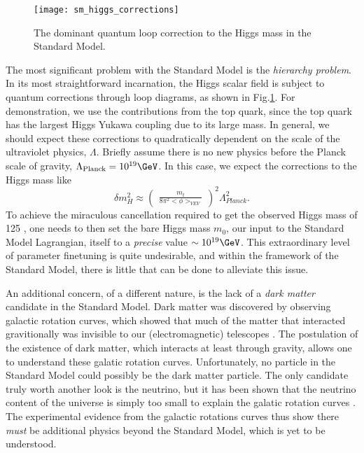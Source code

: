 \begin{figure}
\caption{The dominant quantum loop correction to the Higgs mass in the Standard Model.} \label{fig:sm_higgs_corrections}
\texttt{[image: sm\_higgs\_corrections]}
\end{figure}
The most significant problem with the Standard Model is the \textit{hierarchy problem}.
In its most straightforward incarnation, the Higgs scalar field is subject to quantum corrections through loop diagrams, as shown in Fig.\ref{fig:sm_higgs_corrections}.
For demonstration, we use the contributions from the top quark, since the top quark has the largest Higgs Yukawa coupling due to its large mass.
In general, we should expect these corrections to quadratically dependent on the scale of the ultraviolet physics, $\Lambda$.
Briefly assume there is no new physics before the Planck scale of gravity, $\Lambda_{\text{Planck}} = 10^{19} \GeV$.
In this case, we expect the corrections to the Higgs mass like
\begin{equation}
\delta m^2_H \approx \begin{pmatrix} \frac{m_t}{8\pi^2 <\phi>_{VEV}} \end{pmatrix}^2 \Lambda_{Planck}^2.
\end{equation}
To achieve the miraculous cancellation required to get the observed Higgs mass of 125 \GeV, one needs to then set the bare Higgs mass $m_0$, our input to the Standard Model Lagrangian, itself to a \textit{precise} value $\order 10^{19} \GeV$.
This extraordinary level of parameter finetuning is quite undesirable, and within the framework of the Standard Model, there is little that can be done to alleviate this issue.

An additional concern, of a different nature, is the lack of a \textit{dark matter} candidate in the Standard Model.
Dark matter was discovered by observing galactic rotation curves, which showed that much of the matter that interacted gravitionally was invisible to our (electromagnetic) telescopes \cite{Rubin:1970zza, Roberts:1970zza, Rubin:1980zd, Rubin:1985ze, Bosma:1981zz, Persic:1995ru, darkMatterPrimer}.
The postulation of the existence of dark matter, which interacts at least through gravity, allows one to understand these galatic rotation curves.
Unfortunately, no particle in the Standard Model could possibly be the dark matter particle.
The only candidate truly worth another look is the neutrino, but it has been shown that the neutrino content of the universe is simply too small to explain the galatic rotation curves \cite{Quigg:2008ab, darkMatterPrimer}.
The experimental evidence from the galactic rotations curves thus show there \textit{must} be additional physics beyond the Standard Model, which is yet to be understood.

